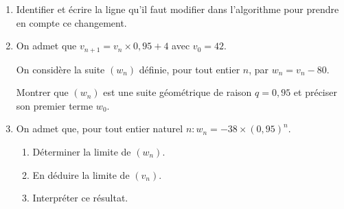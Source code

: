 \begin{enumerate}
     \item
     Identifier et écrire la ligne qu'il faut modifier dans l'algorithme pour prendre en compte ce changement.
     \item
     On admet que $v_{n+1}=v_{n}\times 0,95+4$ avec $v_{0}=42$.
     \par
     On considère la suite $\left(w_{n}\right)$ définie, pour tout entier $n$, par $w_{n}=v_{n}-80$.
     \par
     Montrer que $\left(w_{n}\right)$ est une suite géométrique de raison $q=0,95$ et préciser son premier terme $w_{0}$.
     \item
     On admet que, pour tout entier naturel $n : w_{n}=-38\times \left(0,95\right)^{n}$.
     \begin{enumerate}[label=\alph*.]
          \item
          Déterminer la limite de $\left(w_{n}\right)$.
          \item
          En déduire la limite de $\left(v_{n}\right)$.
          \item
          Interpréter ce résultat.
     \end{enumerate}
\end{enumerate}
